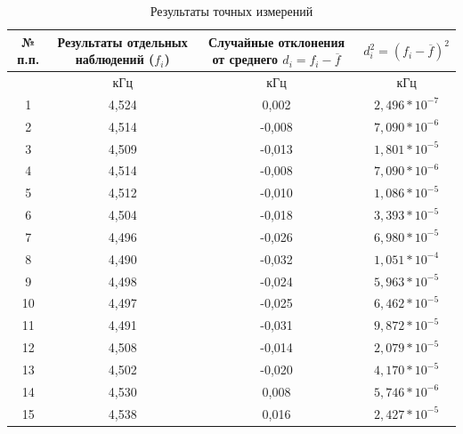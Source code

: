 \begin{center}
\begin{table}[h!]
\centering
\caption{Результаты точных измерений}
\label{tabl:2}
\begin{tabular}{|c|c|c|c|}
\hline
\begin{minipage}{7mm}
    № п.п. 
\end{minipage}&
\begin{minipage}{5cm}
    Результаты отдельных наблюдений ($f_i$)
\end{minipage} &
\begin{minipage}{5cm}
    Случайные отклонения от среднего $d_i = f_i - \overline{f}$
\end{minipage} &
\begin{minipage}{5cm}
     $d_i^2 = (f_i - \overline{f})^2$
\end{minipage}\\
\hline
{}&кГц&кГц&кГц\\
\hline
1 & 4,524 & 0,002 & $2,496*10^{-7}$ \\
2 & 4,514 & -0,008 & $7,090*10^{-6}$ \\
3 & 4,509 & -0,013 & $1,801*10^{-5}$ \\
4 & 4,514 & -0,008 & $7,090*10^{-6}$ \\
5 & 4,512 & -0,010 & $1,086*10^{-5}$ \\
6 & 4,504 & -0,018 & $3,393*10^{-5}$ \\
7 & 4,496 & -0,026 & $6,980*10^{-5}$ \\
8 & 4,490 & -0,032 & $1,051*10^{-4}$ \\
9 & 4,498 & -0,024 & $5,963*10^{-5}$ \\
10 & 4,497 & -0,025 & $6,462*10^{-5}$ \\
11 & 4,491 & -0,031 & $9,872*10^{-5}$ \\
12 & 4,508 & -0,014 & $2,079*10^{-5}$ \\
13 & 4,502 & -0,020 & $4,170*10^{-5}$ \\
14 & 4,530 & 0,008 & $5,746*10^{-6}$ \\
15 & 4,538 & 0,016 & $2,427*10^{-5}$ \\
\hline
\end{tabular}
\end{table}
\end{center}

